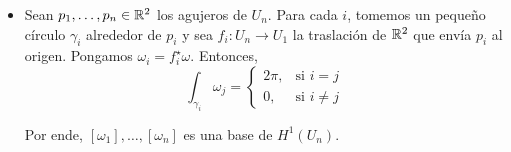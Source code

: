 \begin{solution}
\begin{itemize}
    \item Sean $p_1, \dots, p_n \in \mathbb R^2$ los agujeros de $U_n$. Para cada $i$, tomemos un pequeño círculo $\gamma_i$ alrededor de $p_i$ y sea $f_i : U_n \to U_1$ la traslación de $\mathbb R^2$ que envía $p_i$ al origen. Pongamos $\omega_i = f_i^\star \omega$. Entonces,
    $$
    \int_{\gamma_i} \omega_j =
        \begin{cases}
            2\pi, & \text{si } i = j \\
            0, & \text{si } i \ne j
        \end{cases}
    $$
    
    Por ende, $[\omega_1], \dots, [\omega_n]$ es una base de $H^1(U_n)$.
\end{itemize}
\end{solution}
